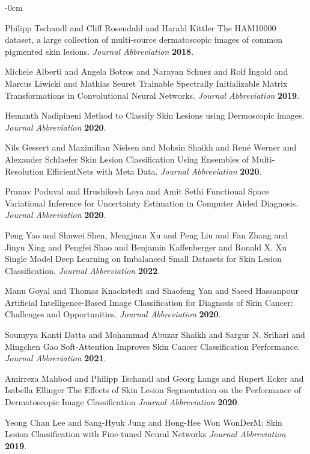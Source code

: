 \documentclass[sensors,article,submit,pdftex,moreauthors]{Definitions/mdpi}
\begin{document}
\begin{adjustwidth}{-\extralength}{0cm}
\begin{thebibliography}{999}
Philipp Tschandl and Cliff Rosendahl and Harald Kittler The HAM10000 dataset, a large collection of multi-source dermatoscopic images of common pigmented skin lesions. 
{\em Journal Abbreviation} 
{\bf 2018}.

Michele Alberti and Angela Botros and Narayan Schuez and Rolf Ingold and Marcus Liwicki and Mathias Seuret Trainable Spectrally Initializable Matrix Transformations in Convolutional Neural Networks. 
{\em Journal Abbreviation} 
{\bf 2019}.

Hemanth Nadipineni Method to Classify Skin Lesions using Dermoscopic images. {\em Journal Abbreviation} 
{\bf 2020}.

Nils Gessert and Maximilian Nielsen and Mohsin Shaikh and René Werner and Alexander Schlaefer Skin Lesion Classification Using Ensembles of Multi-Resolution EfficientNets with Meta Data. 
{\em Journal Abbreviation} 
{\bf 2020}.

Pranav Poduval and Hrushikesh Loya and Amit Sethi Functional Space Variational Inference for Uncertainty Estimation in Computer Aided Diagnosis. 
{\em Journal Abbreviation} 
{\bf 2020}.

Peng Yao and Shuwei Shen, Mengjuan Xu and Peng Liu and Fan Zhang and Jinyu Xing and Pengfei Shao and Benjamin Kaffenberger and Ronald X. Xu Single Model Deep Learning on Imbalanced Small Datasets for Skin Lesion Classification. 
{\em Journal Abbreviation} 
{\bf 2022}.

Manu Goyal and Thomas Knackstedt and Shaofeng Yan and Saeed Hassanpour Artificial Intelligence-Based Image Classification for Diagnosis of Skin Cancer: Challenges and Opportunities. 
{\em Journal Abbreviation} 
{\bf 2020}.

Soumyya Kanti Datta and  Mohammad Abuzar Shaikh and Sargur N. Srihari and Mingchen Gao Soft-Attention Improves Skin Cancer Classification Performance. {\em Journal Abbreviation} 
{\bf 2021}.

Amirreza Mahbod and Philipp Tschandl and Georg Langs and Rupert Ecker and Isabella Ellinger The Effects of Skin Lesion Segmentation on the	Performance of Dermatoscopic Image Classification
{\em Journal Abbreviation} 
{\bf 2020}.

Yeong Chan Lee and Sang-Hyuk Jung and Hong-Hee Won WonDerM: Skin Lesion Classification with Fine-tuned Neural Networks
{\em Journal Abbreviation} 
{\bf 2019}.


\end{thebibliography}
\end{adjustwidth}
\end{document}
